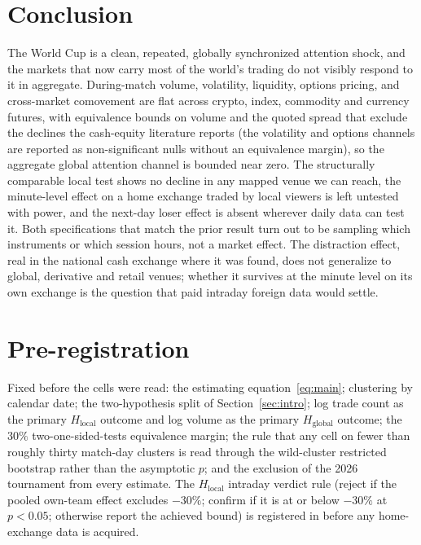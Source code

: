 \documentclass[12pt]{article}
\begin{document}
\section{Conclusion}\label{sec:concl}
The World Cup is a clean, repeated, globally synchronized attention shock, and the markets that now carry most of the world's trading do not visibly respond to it in aggregate. During-match volume, volatility, liquidity, options pricing, and cross-market comovement are flat across crypto, index, commodity and currency futures, with equivalence bounds on volume and the quoted spread that exclude the declines the cash-equity literature reports (the volatility and options channels are reported as non-significant nulls without an equivalence margin), so the aggregate global attention channel is bounded near zero. The structurally comparable local test shows no decline in any mapped venue we can reach, the minute-level effect on a home exchange traded by local viewers is left untested with power, and the next-day loser effect is absent wherever daily data can test it. Both specifications that match the prior result turn out to be sampling which instruments or which session hours, not a market effect. The distraction effect, real in the national cash exchange where it was found, does not generalize to global, derivative and retail venues; whether it survives at the minute level on its own exchange is the question that paid intraday foreign data would settle.

\appendix
\section{Pre-registration}\label{app:prereg}
Fixed before the cells were read: the estimating equation~\eqref{eq:main}; clustering by calendar date;
the two-hypothesis split of Section~\ref{sec:intro}; log trade count as the primary $H_{\text{local}}$
outcome and log volume as the primary $H_{\text{global}}$ outcome; the $30\%$ two-one-sided-tests
equivalence margin; the rule that any cell on fewer than roughly thirty match-day clusters is read through
the wild-cluster restricted bootstrap rather than the asymptotic $p$; and the exclusion of the 2026
tournament from every estimate. The $H_{\text{local}}$ intraday verdict rule (reject if the pooled own-team
effect excludes $-30\%$; confirm if it is at or below $-30\%$ at $p<0.05$; otherwise report the achieved
bound) is registered in  before any home-exchange data is acquired.
\end{document}
